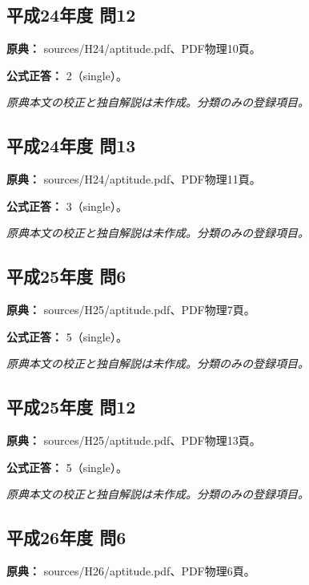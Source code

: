 \subsection{平成24年度 問12}
\label{q:h24-reg-apt-12}

\noindent\textbf{原典：} sources/H24/aptitude.pdf、PDF物理10頁。

\textbf{公式正答：} 2（single）。

\par\textit{原典本文の校正と独自解説は未作成。分類のみの登録項目。}

\subsection{平成24年度 問13}
\label{q:h24-reg-apt-13}

\noindent\textbf{原典：} sources/H24/aptitude.pdf、PDF物理11頁。

\textbf{公式正答：} 3（single）。

\par\textit{原典本文の校正と独自解説は未作成。分類のみの登録項目。}

\subsection{平成25年度 問6}
\label{q:h25-reg-apt-06}

\noindent\textbf{原典：} sources/H25/aptitude.pdf、PDF物理7頁。

\textbf{公式正答：} 5（single）。

\par\textit{原典本文の校正と独自解説は未作成。分類のみの登録項目。}

\subsection{平成25年度 問12}
\label{q:h25-reg-apt-12}

\noindent\textbf{原典：} sources/H25/aptitude.pdf、PDF物理13頁。

\textbf{公式正答：} 5（single）。

\par\textit{原典本文の校正と独自解説は未作成。分類のみの登録項目。}

\subsection{平成26年度 問6}
\label{q:h26-reg-apt-06}

\noindent\textbf{原典：} sources/H26/aptitude.pdf、PDF物理6頁。

